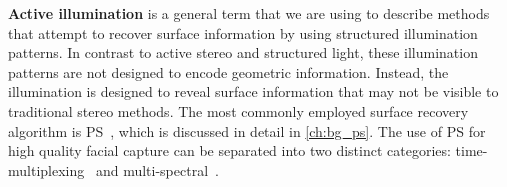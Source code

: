 \textbf{Active illumination} is a general term that we are using to describe
methods that attempt to recover surface information by using structured
illumination patterns. In contrast to active stereo and structured
light, these illumination patterns are not designed to encode geometric
information. Instead, the illumination is designed to reveal surface information
that may not be visible to traditional stereo methods. 
The most commonly employed surface recovery
algorithm is PS~\cite{woodham1980photometric}, which is discussed in detail in 
\cref{ch:bg_ps}. The use of PS for high quality facial capture
can be separated into two distinct categories: time-multiplexing~\cite{ma2007rapid,%
fyffe2011comprehensive,alexander2009digital,vonderPahlen:2014kg,%
malzbender2006surface,wilson2010temporal,ghosh2011multiview} and
multi-spectral~\cite{vogiatzis2012self,brostow2011video,fyffe2011single}.

